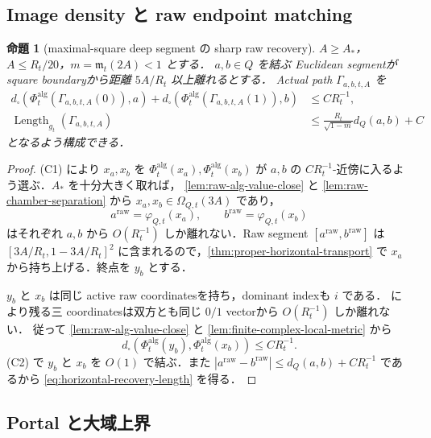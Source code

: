 \documentclass[a4paper,11pt]{ltjsarticle}
\numberwithin{equation}{section}
\theoremstyle{plain}
\newtheorem{proposition}[proposition]{命題}
\theoremstyle{definition}
\theoremstyle{remark}
\newcommand{\Length}{\operatorname{Length}}
\begin{document}
\subsection{Image density と raw endpoint matching}

\begin{proposition}[maximal-square deep segment の sharp raw recovery]\label{prop:sharp-horizontal-recovery}
$A\ge A_*$，$A\le R_t/20$，$m=\mathfrak m_t(2A)<1$ とする．
$a,b\in Q$ を結ぶ Euclidean segmentが square boundaryから距離 $5A/R_t$ 以上離れるとする．
Actual path $\Gamma_{a,b,t,A}$ を
\begin{align}
 d_\square(\Phi_t^{\mathrm{alg}}(\Gamma_{a,b,t,A}(0)),a)
 +d_\square(\Phi_t^{\mathrm{alg}}(\Gamma_{a,b,t,A}(1)),b)
 &\le CR_t^{-1},\label{eq:horizontal-recovery-label}\\
 \Length_{g_t}(\Gamma_{a,b,t,A})
 &\le \frac{R_t}{\sqrt{1-m}}d_Q(a,b)+C
 \label{eq:horizontal-recovery-length}
\end{align}
となるよう構成できる．
\end{proposition}

\begin{proof}
(C1) により $x_a,x_b$ を $\Phi_t^{\mathrm{alg}}(x_a),\Phi_t^{\mathrm{alg}}(x_b)$ が
$a,b$ の $CR_t^{-1}$-近傍に入るよう選ぶ．$A_*$ を十分大きく取れば，
\cref{lem:raw-alg-value-close} と \cref{lem:raw-chamber-separation} から $x_a,x_b\in\Omega_{Q,t}(3A)$ であり，
\[
 a^{\mathrm{raw}}=\varphi_{Q,t}(x_a),\qquad b^{\mathrm{raw}}=\varphi_{Q,t}(x_b)
\]
はそれぞれ $a,b$ から $O(R_t^{-1})$ しか離れない．Raw segment
$[a^{\mathrm{raw}},b^{\mathrm{raw}}]$ は
$[3A/R_t,1-3A/R_t]^2$ に含まれるので，\cref{thm:proper-horizontal-transport} で $x_a$ から持ち上げる．終点を $y_b$ とする．

$y_b$ と $x_b$ は同じ active raw coordinatesを持ち，dominant indexも $i$ である．
 により残る三 coordinatesは双方とも同じ $0/1$ vectorから $O(R_t^{-1})$ しか離れない．
従って \cref{lem:raw-alg-value-close} と \cref{lem:finite-complex-local-metric} から
\[
 d_\square(\Phi_t^{\mathrm{alg}}(y_b),\Phi_t^{\mathrm{alg}}(x_b))\le CR_t^{-1}.
\]
(C2) で $y_b$ と $x_b$ を $O(1)$ で結ぶ．また
$|a^{\mathrm{raw}}-b^{\mathrm{raw}}|\le d_Q(a,b)+CR_t^{-1}$ であるから \eqref{eq:horizontal-recovery-length} を得る．
\end{proof}

\subsection{Portal と大域上界}
\end{document}
